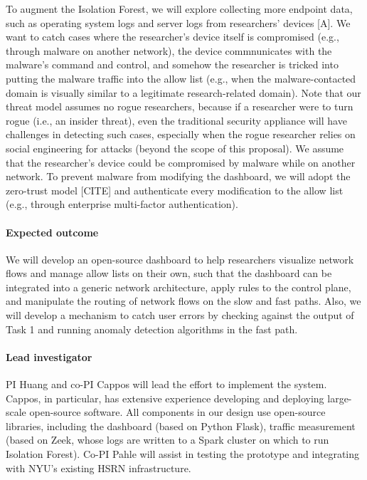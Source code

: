 To augment the Isolation Forest, we will explore collecting more endpoint data, such as operating system logs and server logs from researchers' devices [A]. We want to catch cases where the researcher's device itself is compromised (e.g., through malware on another network), the device commnunicates with the malware's command and control, and somehow the researcher is tricked into putting the malware traffic into the allow list (e.g., when the malware-contacted domain is visually similar to a legitimate research-related domain). Note that our threat model assumes no rogue researchers, because if a researcher were to turn rogue (i.e., an insider threat), even the traditional security appliance will have challenges in detecting such cases, especially when the rogue researcher relies on social engineering for attacks (beyond the scope of this proposal). We assume that the researcher's device could be compromised by malware while on another network. To prevent malware from modifying the dashboard, we will adopt the zero-trust model [CITE] and authenticate every modification to the allow list (e.g., through enterprise multi-factor authentication).
















\paragraph{Expected outcome} We will develop an open-source dashboard to help researchers visualize network flows and manage allow lists on their own, such that the dashboard can be integrated into a generic network architecture, apply rules to the control plane, and manipulate the routing of network flows on the slow and fast paths. Also, we will develop a mechanism to catch user errors by checking against the output of Task 1 and running anomaly detection algorithms in the fast path.


\paragraph{Lead investigator} PI Huang and co-PI Cappos will lead the effort to implement the system. Cappos, in particular, has extensive experience developing and deploying large-scale open-source software. All components in our design use open-source libraries, including the dashboard (based on Python Flask), traffic measurement (based on Zeek, whose logs are written to a Spark cluster on which to run Isolation Forest). Co-PI Pahle will assist in testing the prototype and integrating with NYU's existing HSRN infrastructure.

